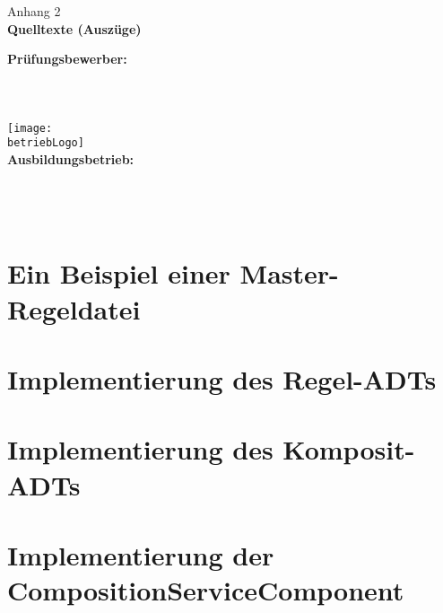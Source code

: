 \documentclass[
    ngerman,
    parskip=half
]{scrartcl}
\begin{document}
\begin{titlepage}

    \begin{center}
        \LARGE{Anhang 2}\\
        \huge{\textbf{Quelltexte (Auszüge)}}\\[42ex]

        \normalsize

        \textbf{Prüfungsbewerber:}\\
        \autorName\\
        \autorAnschrift\\
        \autorOrt\\[5ex]

        \texttt{[image: \\betriebLogo]}\\[2ex]
        \textbf{Ausbildungsbetrieb:}\\
        \betriebName\\
        \betriebAnschrift\\
        \betriebOrt\\[5em]

    \end{center}

\end{titlepage}

\appendix
{}

\section{Ein Beispiel einer Master-Regeldatei}


\section{Implementierung des Regel-ADTs}


\clearpage

\section{Implementierung des Komposit-ADTs}


\clearpage

\section{Implementierung der CompositionServiceComponent}

\end{document}

